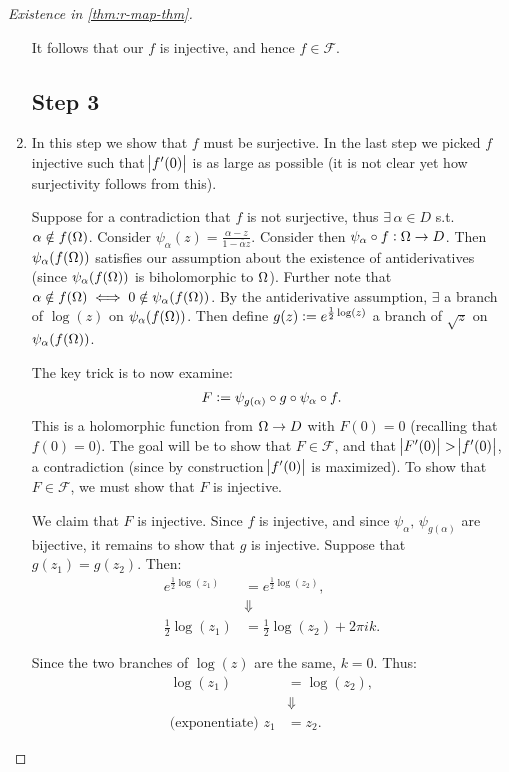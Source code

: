 \begin{proof}[Existence in \ref{thm:r-map-thm}]
\begin{enumerate}
It follows that our $f$ is injective, and hence $f \in \mathscr{F}$.

\subsection{Step 3}

\item In this step we show that $f$ must be surjective. In the last step we picked $f$ injective such that $\abs{f'(0)}$ is as large as possible (it is not clear yet how surjectivity follows from this).

Suppose for a contradiction that $f$ is not surjective, thus $\exists \, \alpha \in D$ s.t. $\alpha \notin f(\Omega)$. Consider $\psi_\alpha (z) = \frac{\alpha - z}{ 1 - \overline{\alpha} z}$. Consider then $\psi_\alpha \circ f : \Omega \to D$. Then $\psi_\alpha ( f(\Omega))$ satisfies our assumption about the existence of antiderivatives (since $\psi_\alpha ( f(\Omega))$  is biholomorphic to $\Omega$). Further note that $\alpha \notin f(\Omega) \iff 0 \notin \psi_\alpha ( f(\Omega))$. By the antiderivative assumption, $\exists$ a branch of $\log(z) $ on $\psi_\alpha ( f(\Omega))$. Then define $g ( z) \vcentcolon = e^{\frac{1}{2} \log(z)}$ a branch of $\sqrt{z}$ on $\psi_\alpha ( f(\Omega))$.

The key trick is to now examine:
\begin{align*}
    F \vcentcolon = \psi_{g(\alpha)} \circ g \circ \psi_\alpha \circ f.
\end{align*}
This is a holomorphic function from $\Omega \to D$ with $F(0) = 0$ (recalling that $f(0) = 0$). The goal will be to show that $F \in \mathscr{F}$, and that $\abs{F'(0)} > \abs{f'(0)}$, a contradiction (since by construction $\abs{f'(0)}$ is maximized). To show that $F\in \mathscr{F}$, we must show that $F$ is injective.

We claim that $F$ is injective. Since $f$ is injective, and since $\psi_\alpha, \, \psi_{g(\alpha)}$ are bijective, it remains to show that $g$ is injective. Suppose that $g(z_1) = g(z_2)$. Then:
\begin{align*}
    e^{\frac{1}{2} \log(z_1)} &= e^{\frac{1}{2} \log(z_2)},\\
    &\Downarrow\\
    \frac{1}{2} \log(z_1) &= \frac{1}{2}\log(z_2) + 2 \pi i k.
\end{align*}

Since the two branches of $\log(z)$ are the same, $k=0$. Thus:
\begin{align*}
    \log(z_1) &= \log(z_2),\\
    &\Downarrow\\
    \text{(exponentiate) } z_1 &= z_2.
\end{align*}


\end{enumerate}
\end{proof}
